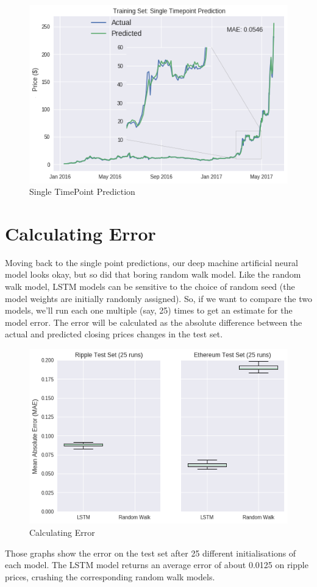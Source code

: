 \begin{figure}[h]
    \centering \includegraphics[scale=0.5]{images/s-p.png}
    \caption{Single TimePoint Prediction}
\end{figure}

\section{Calculating Error}
Moving back to the single point predictions, our deep machine artificial neural model looks okay, but so did that boring random walk model. Like the random walk model, LSTM models can be sensitive to the choice of random seed (the model weights are initially randomly assigned). So, if we want to compare the two models, we'll run each one multiple (say, 25) times to get an estimate for the model error. The error will be calculated as the absolute difference between the actual and predicted closing prices changes in the test set.
\begin{figure}[h]
    \centering \includegraphics[scale=0.5]{images/error.png}
    \caption{Calculating Error}
\end{figure}
 Those graphs show the error on the test set after 25 different initialisations of each model. The LSTM model returns an average error of about 0.0125 on ripple prices, crushing the corresponding random walk models.
